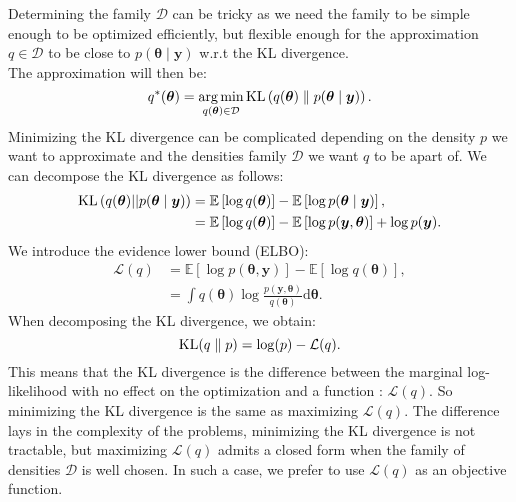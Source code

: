 \documentclass{article}
\DeclareMathOperator*{\argmin}{arg\,min}
\DeclareMathOperator*{\KL}{{\rm KL}}
\begin{document}
\newline
%
Determining the family $\mathcal{D}$ can be tricky as we need the family to be simple enough to be optimized efficiently, but flexible enough for the approximation $q \in \mathcal{D}$ to be close to $p(\boldsymbol{\theta} \mid \boldsymbol{y})$ w.r.t the KL divergence.\\
\newline
%
The approximation will then be:
\begin{equation*}
q^*(\boldsymbol{\theta} ) = \argmin_{q(\boldsymbol{\theta}) \in \mathcal{D}} \KL\left( q(\boldsymbol{\theta}) \parallel p(\boldsymbol{\theta} \mid \boldsymbol{y})\right).
\end{equation*}
Minimizing the KL divergence can be complicated depending on the density $p$ we want to approximate and the densities family $\mathcal{D}$ we want $q$ to be apart of. We can decompose the KL divergence as follows:
\begin{align*}
\KL\left(q(\boldsymbol{\theta})||p(\boldsymbol{\theta}\mid \boldsymbol{y})\right) &= \mathbb{E}\left[\log q(\boldsymbol{\theta})\right] - \mathbb{E}\left[\log p(\boldsymbol{\theta}\mid \boldsymbol{y})\right],\\
&= \mathbb{E}\left[\log q(\boldsymbol{\theta})\right] - \mathbb{E}\left[\log p(\boldsymbol{y},\boldsymbol{\theta})\right] + \log p(\boldsymbol{y}).
\end{align*}
We introduce the evidence lower bound (ELBO):
\begin{align*}
\mathcal{L}(q) &= \mathbb{E}\left[\log p(\boldsymbol{\theta},\boldsymbol{y})\right] - \mathbb{E}\left[\log q(\boldsymbol{\theta})\right],\\
&=\int q(\boldsymbol{\theta})\log\frac{p(\boldsymbol{y},\boldsymbol{\theta})}{q(\boldsymbol{\theta})}\mathrm{d}\boldsymbol{\theta}.
\end{align*}
When decomposing the KL divergence, we obtain:
\begin{equation*}
\KL(q\parallel p) = \log(p) - \mathcal{L}(q).
\end{equation*}
This means that the KL divergence is the difference between the marginal log-likelihood with no effect on the optimization and a function : $\mathcal{L}(q)$. So minimizing the KL divergence is the same as maximizing $\mathcal{L}(q)$. The difference lays in the complexity of the problems, minimizing the KL divergence is not tractable, but maximizing $\mathcal{L}(q)$ admits a closed form when the family of densities $\mathcal{D}$ is well chosen. In such a case, we prefer to use $\mathcal{L}(q)$ as an objective function.\\
\end{document}
